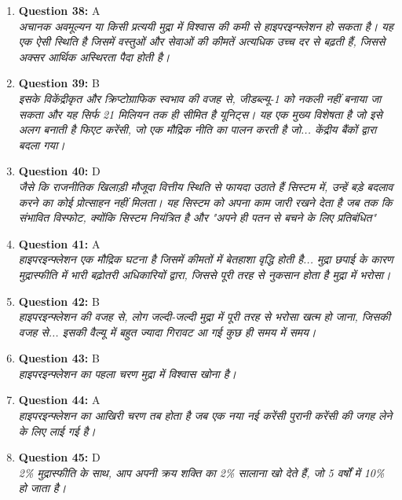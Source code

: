 \documentclass[12pt,a4paper]{article}
\begin{document}
\begin{enumerate}
\item \textbf{Question 38:} A
\\ \textit{अचानक अवमूल्यन या किसी प्रत्ययी मुद्रा में विश्वास की कमी से हाइपरइन्फ्लेशन हो सकता है। यह एक ऐसी स्थिति है जिसमें वस्तुओं और सेवाओं की कीमतें अत्यधिक उच्च दर से बढ़ती हैं, जिससे अक्सर आर्थिक अस्थिरता पैदा होती है।}

\item \textbf{Question 39:} B
\\ \textit{इसके विकेंद्रीकृत और क्रिप्टोग्राफिक स्वभाव की वजह से, जीडब्ल्यू-1 को नकली नहीं बनाया जा सकता और यह सिर्फ 21 मिलियन तक ही सीमित है यूनिट्स। यह एक मुख्य विशेषता है जो इसे अलग बनाती है फिएट करेंसी, जो एक मौद्रिक नीति का पालन करती है जो... केंद्रीय बैंकों द्वारा बदला गया।}

\item \textbf{Question 40:} D
\\ \textit{जैसे कि राजनीतिक खिलाड़ी मौजूदा वित्तीय स्थिति से फायदा उठाते हैं सिस्टम में, उन्हें बड़े बदलाव करने का कोई प्रोत्साहन नहीं मिलता। यह सिस्टम को अपना काम जारी रखने देता है जब तक कि संभावित विस्फोट, क्योंकि सिस्टम नियंत्रित है और "अपने ही पतन से बचने के लिए प्रतिबंधित"}

\item \textbf{Question 41:} A
\\ \textit{हाइपरइन्फ्लेशन एक मौद्रिक घटना है जिसमें कीमतों में बेतहाशा वृद्धि होती है... मुद्रा छपाई के कारण मुद्रास्फीति में भारी बढ़ोतरी अधिकारियों द्वारा, जिससे पूरी तरह से नुकसान होता है मुद्रा में भरोसा।}

\item \textbf{Question 42:} B
\\ \textit{हाइपरइन्फ्लेशन की वजह से, लोग जल्दी-जल्दी मुद्रा में पूरी तरह से भरोसा खत्म हो जाना, जिसकी वजह से... इसकी वैल्यू में बहुत ज्यादा गिरावट आ गई कुछ ही समय में समय।}

\item \textbf{Question 43:} B
\\ \textit{हाइपरइन्फ्लेशन का पहला चरण मुद्रा में विश्वास खोना है।}

\item \textbf{Question 44:} A
\\ \textit{हाइपरइन्फ्लेशन का आखिरी चरण तब होता है जब एक नया नई करेंसी पुरानी करेंसी की जगह लेने के लिए लाई गई है।}

\item \textbf{Question 45:} D
\\ \textit{2\% मुद्रास्फीति के साथ, आप अपनी क्रय शक्ति का 2\% सालाना खो देते हैं, जो 5 वर्षों में 10\% हो जाता है।}


\end{enumerate}
\end{document}
